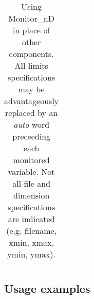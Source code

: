 \begin{table}
\begin{center}
{\begin{tabular}{|p{}|p{}|}
        \hline
    \end{tabular}
    \caption{Using Monitor\_nD in place of other components. All limits specifications may be advantageously replaced by an \textit{auto} word preceeding each monitored variable. Not all file and dimension specifications are indicated (e.g. filename, xmin, xmax, ymin, ymax).}
    \label{t:monitor-nd-equiv}
    }
  \end{center}
\end{table}

\subsection{Usage examples}

